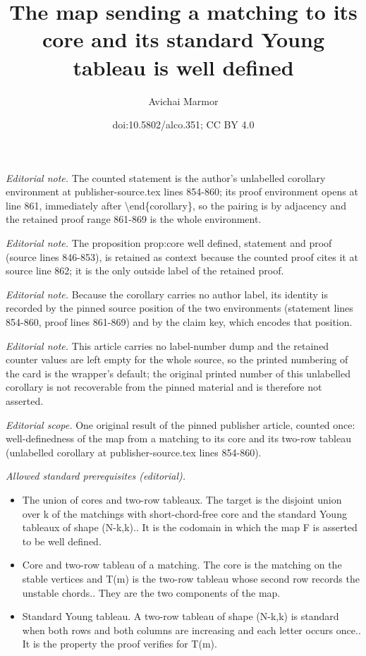 \documentclass[11pt]{article}
\title{The map sending a matching to its core and its standard Young tableau is well defined}
\author{Avichai Marmor}
\date{doi:10.5802/alco.351; CC BY 4.0}
\theoremstyle{definition}
\numberwithin{equation}{section}
\begin{document}
\maketitle
\noindent\textit{Editorial note.} The counted statement is the author's unlabelled corollary environment at publisher-source.tex lines 854-860; its proof environment opens at line 861, immediately after \textbackslash{}end\{corollary\}, so the pairing is by adjacency and the retained proof range 861-869 is the whole environment.\par\medskip
\noindent\textit{Editorial note.} The proposition prop:core well defined, statement and proof (source lines 846-853), is retained as context because the counted proof cites it at source line 862; it is the only outside label of the retained proof.\par\medskip
\noindent\textit{Editorial note.} Because the corollary carries no author label, its identity is recorded by the pinned source position of the two environments (statement lines 854-860, proof lines 861-869) and by the claim key, which encodes that position.\par\medskip
\noindent\textit{Editorial note.} This article carries no label-number dump and the retained counter values are left empty for the whole source, so the printed numbering of the card is the wrapper's default; the original printed number of this unlabelled corollary is not recoverable from the pinned material and is therefore not asserted.\par\medskip
\noindent\textit{Editorial scope.} One original result of the pinned publisher article, counted once: well-definedness of the map from a matching to its core and its two-row tableau (unlabelled corollary at publisher-source.tex lines 854-860).\par\medskip
\noindent\textit{Allowed standard prerequisites (editorial).}\begin{itemize}
\item The union of cores and two-row tableaux. The target is the disjoint union over k of the matchings with short-chord-free core and the standard Young tableaux of shape (N-k,k).. It is the codomain in which the map F is asserted to be well defined.
\item Core and two-row tableau of a matching. The core is the matching on the stable vertices and T(m) is the two-row tableau whose second row records the unstable chords.. They are the two components of the map.
\item Standard Young tableau. A two-row tableau of shape (N-k,k) is standard when both rows and both columns are increasing and each letter occurs once.. It is the property the proof verifies for T(m).
\end{itemize}\medskip
\end{document}
